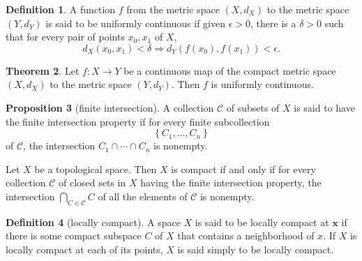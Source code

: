 \documentclass[12pt,a4paper]{book}
\theoremstyle{definition}
\newtheorem{defn}{Definition}[section]
\newtheorem{theo}[defn]{Theorem}
\newtheorem{prop}[defn]{Proposition}
\begin{document}
\begin{defn}
    A function $f$ from the metric space $\left(X, d_X\right)$ to the metric space $\left(Y, d_Y\right)$ is said to be uniformly continuous if given $\epsilon>0$, there is a $\delta>0$ such that for every pair of points $x_0, x_1$ of $X$,
    $$
        d_X\left(x_0, x_1\right)<\delta \Longrightarrow d_Y\left(f\left(x_0\right), f\left(x_1\right)\right)<\epsilon .
    $$
\end{defn}
\begin{theo}
    Let $f: X \rightarrow Y$ be a continuous map of the compact metric space $\left(X, d_X\right)$ to the metric space $\left(Y, d_Y\right)$. Then $f$ is uniformly continuous.
\end{theo}
\begin{prop}[finite intersection]
    A collection $\mathcal{C}$ of subsets of $X$ is said to have the finite intersection property if for every finite subcollection
    $$
        \left\{C_1, \ldots, C_n\right\}
    $$
    of $\mathcal{C}$, the intersection $C_1 \cap \cdots \cap C_n$ is nonempty.

    Let $X$ be a topological space. Then $X$ is compact if and only if for every collection $\mathcal{C}$ of closed sets in $X$ having the finite intersection property, the intersection $\bigcap_{C \in \mathcal{C}} C$ of all the elements of $\mathcal{C}$ is nonempty.
\end{prop}








\begin{defn}[locally compact]
    A space $X$ is said to be locally compact at $\boldsymbol{x}$ if there is some compact subspace $C$ of $X$ that contains a neighborhood of $x$. If $X$ is locally compact at each of its points, $X$ is said simply to be locally compact.
\end{defn}
\end{document}

